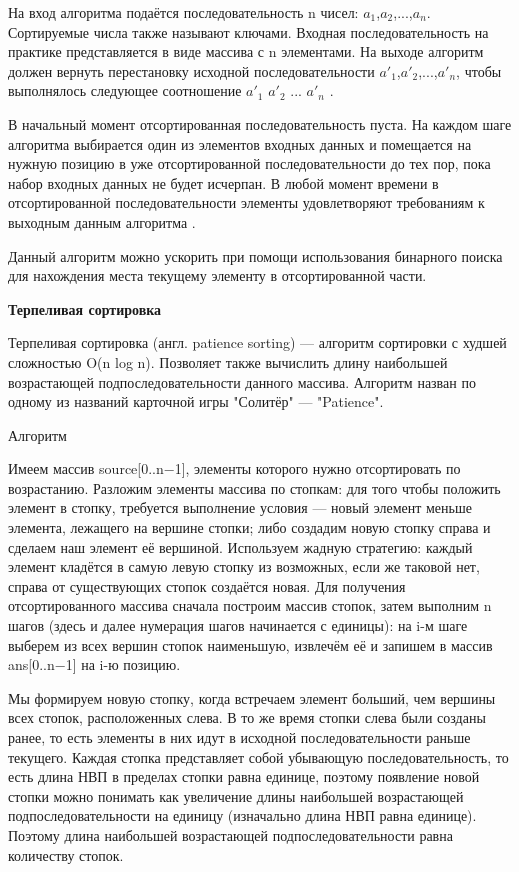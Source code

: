 \documentclass[a4paper, 14pt]{article}
\begin{document}
На вход алгоритма подаётся последовательность n чисел: $a_{1}$,$a_{2}$,...,$a_{n}$.
Сортируемые числа также называют ключами. Входная последовательность на практике представляется в виде массива с n элементами. На выходе алгоритм должен вернуть перестановку исходной последовательности $a'_{1}$,$a'_{2}$,...,$a'_{n}$, чтобы выполнялось следующее соотношение $a'_{1}$ \le $a'_{2}$ ... \le $a'_{n}$ \cite{korman}.

В начальный момент отсортированная последовательность пуста. На каждом шаге алгоритма выбирается один из элементов входных данных и помещается на нужную позицию в уже отсортированной последовательности до тех пор, пока набор входных данных не будет исчерпан. В любой момент времени в отсортированной последовательности элементы удовлетворяют требованиям к выходным данным алгоритма \cite{macconel}.

Данный алгоритм можно ускорить при помощи использования бинарного поиска для нахождения места текущему элементу в отсортированной части.


\begin{doublespace}
\large
\textbf{Терпеливая сортировка}
\normalsize
\end{doublespace}

Терпеливая сортировка (англ. patience sorting) — алгоритм сортировки с худшей сложностью O(n log n). Позволяет также вычислить длину наибольшей возрастающей подпоследовательности данного массива. Алгоритм назван по одному из названий карточной игры "Солитёр" — "Patience".

\begin{doublespace}
\large
Алгоритм
\normalsize
\end{doublespace}

Имеем массив source[0..n−1], элементы которого нужно отсортировать по возрастанию. Разложим элементы массива по стопкам: для того чтобы положить элемент в стопку, требуется выполнение условия — новый элемент меньше элемента, лежащего на вершине стопки; либо создадим новую стопку справа и сделаем наш элемент её вершиной. Используем жадную стратегию: каждый элемент кладётся в самую левую стопку из возможных, если же таковой нет, справа от существующих стопок создаётся новая. Для получения отсортированного массива сначала построим массив стопок, затем выполним n шагов (здесь и далее нумерация шагов начинается с единицы): на i-м шаге выберем из всех вершин стопок наименьшую, извлечём её и запишем в массив ans[0..n−1] на i-ю позицию.

Мы формируем новую стопку, когда встречаем элемент больший, чем вершины всех стопок, расположенных слева. В то же время стопки слева были созданы ранее, то есть элементы в них идут в исходной последовательности раньше текущего. Каждая стопка представляет собой убывающую последовательность, то есть длина НВП в пределах стопки равна единице, поэтому появление новой стопки можно понимать как увеличение длины наибольшей возрастающей подпоследовательности на единицу (изначально длина НВП равна единице). Поэтому длина наибольшей возрастающей подпоследовательности равна количеству стопок.
\end{document}
